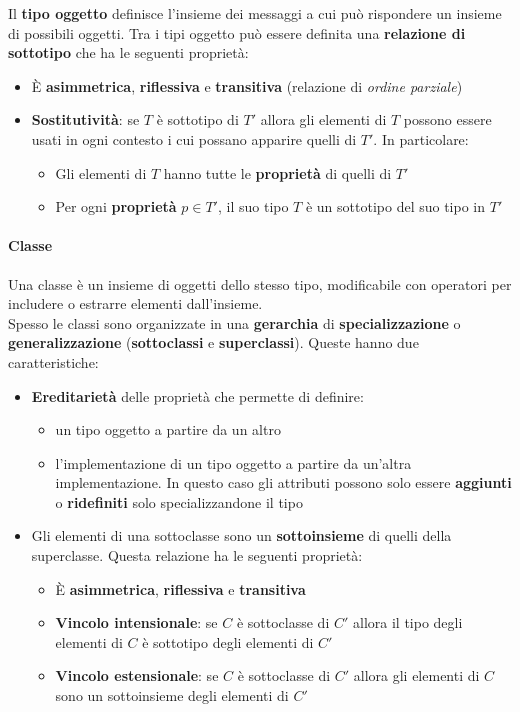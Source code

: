 \noindent Il \textbf{tipo oggetto} definisce l'insieme dei messaggi a cui può rispondere un insieme di possibili oggetti. Tra i tipi oggetto può essere definita una \textbf{relazione di sottotipo} che ha le seguenti proprietà:
\begin{itemize}
	\item È \textbf{asimmetrica}, \textbf{riflessiva} e \textbf{transitiva} (relazione di \textit{ordine parziale})
	\item \textbf{Sostitutività}: se $T$ è sottotipo di $T'$ allora gli elementi di $T$ possono essere usati in ogni contesto i cui possano apparire quelli di $T'$. In particolare:
	\begin{itemize}
		\item Gli elementi di $T$ hanno tutte le \textbf{proprietà} di quelli di $T'$
		\item Per ogni \textbf{proprietà} $p \in T'$, il suo tipo $T$ è un sottotipo del suo tipo in $T'$
	\end{itemize}
\end{itemize}

\paragraph{Classe}
Una classe è un insieme di oggetti dello stesso tipo, modificabile con operatori per includere o estrarre elementi dall'insieme.\\
Spesso le classi sono organizzate in una \textbf{gerarchia} di \textbf{specializzazione} o \textbf{generalizzazione} (\textbf{sottoclassi} e \textbf{superclassi}). Queste hanno due caratteristiche:
\begin{itemize}
	\item \textbf{Ereditarietà} delle proprietà che permette di definire:
	\begin{itemize}
		\item un tipo oggetto a partire da un altro
		\item l'implementazione di un tipo oggetto a partire da un'altra implementazione. In questo caso gli attributi possono solo essere \textbf{aggiunti} o \textbf{ridefiniti} solo specializzandone il tipo
	\end{itemize}
	\item Gli elementi di una sottoclasse sono un \textbf{sottoinsieme} di quelli della superclasse. Questa relazione ha le seguenti proprietà:
	\begin{itemize}
		\item È \textbf{asimmetrica}, \textbf{riflessiva} e \textbf{transitiva}
		\item \textbf{Vincolo intensionale}: se $C$ è sottoclasse di $C'$ allora il tipo degli elementi di $C$ è sottotipo degli elementi di $C'$
		\item \textbf{Vincolo estensionale}: se $C$ è sottoclasse di $C'$ allora gli elementi di $C$ sono un sottoinsieme degli elementi di $C'$
	\end{itemize}
\end{itemize}

